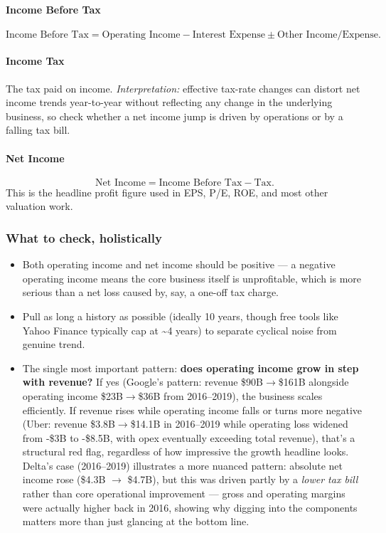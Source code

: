 \documentclass[12pt,openany]{book}
\begin{document}
\paragraph{Income Before Tax}
\begin{equation*}
    \text{Income Before Tax} = \text{Operating Income} - \text{Interest Expense} \pm \text{Other Income/Expense}.
\end{equation*}

\paragraph{Income Tax} The tax paid on income. \emph{Interpretation:} effective tax-rate changes can distort net income trends year-to-year without reflecting any change in the underlying business, so check whether a net income jump is driven by operations or by a falling tax bill.

\paragraph{Net Income}
\begin{equation*}
    \text{Net Income} = \text{Income Before Tax} - \text{Tax}.
\end{equation*}
This is the headline profit figure used in EPS, P/E, ROE, and most other valuation work.

\subsubsection{What to check, holistically}

\begin{itemize}[leftmargin=*]
    \item Both operating income and net income should be positive --- a negative operating income means the core business itself is unprofitable, which is more serious than a net loss caused by, say, a one-off tax charge.
    \item Pull as long a history as possible (ideally 10 years, though free tools like Yahoo Finance typically cap at \textasciitilde{}4 years) to separate cyclical noise from genuine trend.
    \item The single most important pattern: \textbf{does operating income grow in step with revenue?} If yes (Google's pattern: revenue \$90B\(\to\)\$161B alongside operating income \$23B\(\to\)\$36B from 2016--2019), the business scales efficiently. If revenue rises while operating income falls or turns more negative (Uber: revenue \$3.8B\(\to\)\$14.1B in 2016--2019 while operating loss widened from -\$3B to -\$8.5B, with opex eventually exceeding total revenue), that's a structural red flag, regardless of how impressive the growth headline looks. Delta's case (2016--2019) illustrates a more nuanced pattern: absolute net income rose (\$4.3B \(\to\) \$4.7B), but this was driven partly by a \emph{lower tax bill} rather than core operational improvement --- gross and operating margins were actually higher back in 2016, showing why digging into the components matters more than just glancing at the bottom line.
\end{itemize}
\end{document}
